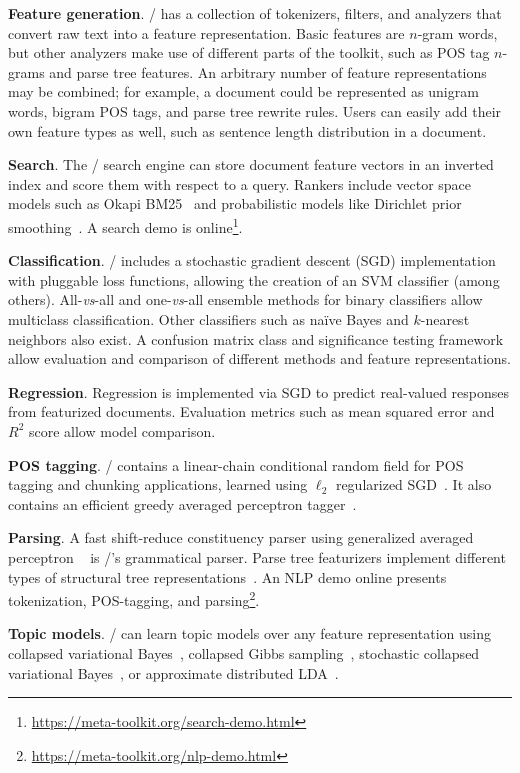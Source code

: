 \textbf{Feature generation}.
\meta/ has a collection of tokenizers, filters, and analyzers that convert raw
text into a feature representation. Basic features are $n$-gram words, but other
analyzers make use of different parts of the toolkit, such as POS tag $n$-grams
and parse tree features. An arbitrary number of feature representations may be
combined; for example, a document could be represented as unigram words, bigram
POS tags, and parse tree rewrite rules. Users can easily add their own feature
types as well, such as sentence length distribution in a document.

\textbf{Search}.
The \meta/ search engine can store document feature vectors in an inverted index
and score them with respect to a query. Rankers include vector space models such
as Okapi BM25~\citep{bm25} and probabilistic models like Dirichlet prior
smoothing~\citep{zhai-lm}. A search demo is
online\footnote{\url{https://meta-toolkit.org/search-demo.html}}.

\textbf{Classification}.
\meta/ includes a stochastic gradient descent (SGD) implementation with
pluggable loss functions, allowing the creation of an SVM classifier (among
others). All-\emph{vs}-all and one-\emph{vs}-all ensemble methods for binary
classifiers allow multiclass classification. Other classifiers such as na{\"i}ve
Bayes and $k$-nearest neighbors also exist. A confusion matrix class and
significance testing framework allow evaluation and comparison of different
methods and feature representations.

\textbf{Regression}.
Regression is implemented via SGD to predict real-valued responses from
featurized documents. Evaluation metrics such as mean squared error and $R^2$
score allow model comparison.

\textbf{POS tagging}.
\meta/ contains a linear-chain conditional random field for POS tagging and
chunking applications, learned using $\ell_2$ regularized SGD~\citep{crf}. It
also contains an efficient greedy averaged perceptron tagger~\citep{greedy}.

\textbf{Parsing}.
A fast shift-reduce constituency parser using generalized averaged perceptron
~\citep{const-parsing} is \meta/'s grammatical parser. Parse tree featurizers
implement different types of structural tree representations~\citep{structural}.
An NLP demo online presents tokenization, POS-tagging, and
parsing\footnote{\url{https://meta-toolkit.org/nlp-demo.html}}.

\textbf{Topic models}.
\meta/ can learn topic models over any feature representation using collapsed
variational Bayes~\citep{cvb}, collapsed Gibbs sampling~\citep{gibbs}, stochastic
collapsed variational Bayes~\citep{scvb}, or approximate distributed
LDA~\citep{pargibbs}.

